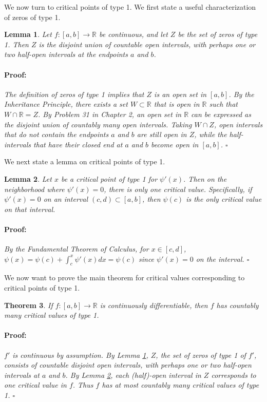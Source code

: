 \documentclass{article}
\newenvironment{proof}{\paragraph{Proof:}}{\hfill$\square$}
\newtheorem{theorem}{Theorem}
\newtheorem{lemma}[theorem]{Lemma}
\newcommand{\R}{\mathbb{R}}
\begin{document}
We now turn to critical points of type 1. We first state a useful characterization of zeros of type 1.

\begin{lemma}
\label{LemmaZerosType1}
Let $f: [a, b] \rightarrow \R$ be continuous, and let $Z$ be the set of zeros of type 1. Then $Z$ is the  disjoint union of countable open intervals, with perhaps one or two half-open intervals at the endpoints $a$ and $b$.
\begin{proof}
The definition of zeros of type 1 implies that $Z$ is an open set in $[a, b]$. By the Inheritance Principle, there exists a set $W \subset \R$ that is open in $\R$ such that $W \cap \R = Z$. By Problem 31 in Chapter 2, an open set in $\R$ can be expressed as the disjoint union of countably many open intervals. Taking $W \cap Z$, open intervals that do not contain the endpoints $a$ and $b$ are still open in $Z$, while the half-intervals that have their closed end at $a$ and $b$ become open in $[a, b]$.
\end{proof}
\end{lemma}

We next state a lemma on critical points of type 1.

\begin{lemma}
\label{LemmaCriticalValuesType1}
Let $x$ be a critical point of type 1 for $\psi'(x)$. Then on the neighborhood where $\psi'(x) = 0$, there is only one critical value. Specifically, if $\psi'(x) = 0$ on an interval $(c, d) \subset [a, b]$, then $\psi(c)$ is the only critical value on that interval.
\begin{proof}
By the Fundamental Theorem of Calculus, for $x \in [c, d]$, $\psi(x) = \psi(c) + \int_c^x \psi'(x) dx = \psi(c)$ since $\psi'(x) = 0$ on the interval. 
\end{proof}
\end{lemma}

We now want to prove the main theorem for critical values corresponding to critical points of type 1.

\begin{theorem}
If $f: [a, b] \rightarrow \R$ is continuously differentiable, then $f$ has countably many critical values of type 1.
\begin{proof}
$f'$ is continuous by assumption. By Lemma \ref{LemmaZerosType1}, $Z$, the set of zeros of type 1 of $f'$, consists of countable disjoint open intervals, with perhaps one or two half-open intervals at $a$ and $b$. By Lemma \ref{LemmaCriticalValuesType1}, each (half)-open interval in $Z$ corresponds to one critical value in $f$. Thus $f$ has at most countably many critical values of type 1.
\end{proof}
\end{theorem}
\end{document}
